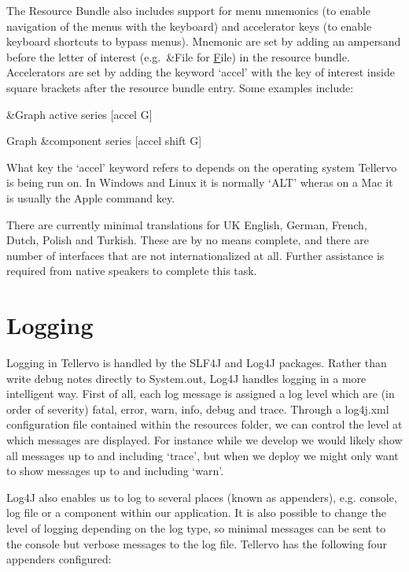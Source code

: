 The Resource Bundle also includes support for menu mnemonics (to enable navigation of the menus with the keyboard) and accelerator keys (to enable keyboard shortcuts to bypass menus).  Mnemonic are set by adding an ampersand before the letter of interest (e.g.\ {\&}File for \underline{F}ile) in the resource bundle.  Accelerators are set by adding the keyword `accel' with the key of interest inside square brackets after the resource bundle entry.  Some examples include:

\begin{itemize*}
 \item {\&}Graph active series [accel G]
 \item Graph {\&}component series [accel shift G]
\end{itemize*}

What key the `accel' keyword refers to depends on the operating system Tellervo is being run on.  In Windows and Linux it is normally `ALT' wheras on a Mac it is usually the Apple command key. 

There are currently minimal translations for UK English, German, French, Dutch, Polish and Turkish.  These are by no means complete, and there are number of interfaces that are not internationalized at all.  Further assistance is required from native speakers to complete this task.

\section{Logging}
Logging in Tellervo is handled by the SLF4J and Log4J packages.  Rather than write debug notes directly to System.out, Log4J handles logging in a more intelligent way.  First of all, each log message is assigned a log level which are (in order of severity) fatal, error, warn, info, debug and trace.  Through a log4j.xml configuration file contained within the resources folder, we can control the level at which messages are displayed.  For instance while we develop we would likely show all messages up to and including `trace', but when we deploy we might only want to show messages up to and including `warn'. 

Log4J also enables us to log to several places (known as appenders), e.g. console, log file or a component within our application.  It is also possible to change the level of logging depending on the log type, so minimal messages can be sent to the console but verbose messages to the log file.  Tellervo has the following four appenders configured:

